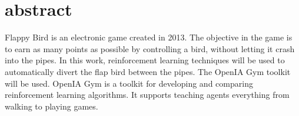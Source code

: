 \section{abstract}
  Flappy Bird is an electronic game created in 2013. The objective in the game is to earn as many points as possible by controlling a bird, without letting it crash into the pipes. In this work, reinforcement learning techniques will be used to automatically divert the flap bird between the pipes. The OpenIA Gym toolkit will be used. OpenIA Gym is a toolkit for developing and comparing reinforcement learning algorithms. It supports teaching agents everything from walking to playing games.
